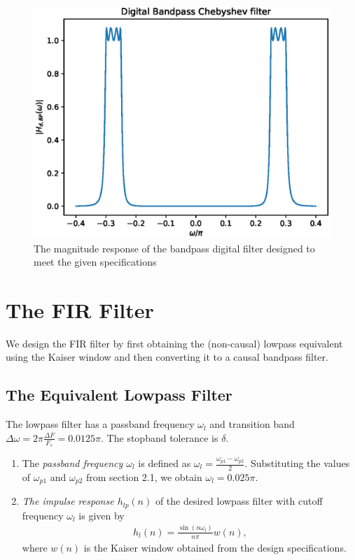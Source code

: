 \documentclass{article}
\begin{document}
\begin{figure}
\label{fig5}
\includegraphics[width = 15cm]{./codes/iir/figs/ee18btech11012_digital_IIR_Bandpass.eps}
\caption{The magnitude response of the bandpass digital filter designed to meet the given specifications} 
\end{figure}


\section{The FIR Filter}
We design the FIR filter by first obtaining the (non-causal) lowpass equivalent using the Kaiser window
and then
converting it to a causal bandpass filter.

\subsection{The Equivalent Lowpass Filter}
The lowpass filter has a passband frequency $\omega_l$ and transition band $\Delta \omega = 2\pi \frac{\Delta F}{F_s} = 0.0125\pi$.
The stopband tolerance is $\delta$.
\begin{enumerate}
\item  The {\em passband frequency $\omega_l$}  is defined as $\omega_l = \frac{\omega_{p1} - \omega_{p2}}{2}$.  Substituting the values of $\omega_{p1}$ and $\omega_{p2}$ from section 2.1, we obtain $\omega_l = 0.025\pi$.

\item {\em The impulse response $h_{lp}(n)$} of the desired lowpass filter with cutoff frequency $\omega_l$
is given by
\begin{eqnarray}
\label{firlpdef}
h_l(n) = \frac{\sin(n\omega_l)}{n\pi}w(n),
\end{eqnarray}
where $w(n)$ is the Kaiser window obtained from the design specifications.
\end{enumerate}
\end{document}
